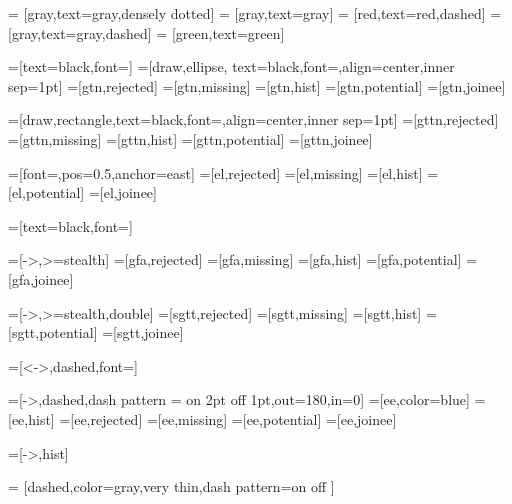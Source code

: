 	\tikzset{every picture/.style = semithick,node distance=1.5cm}
	     = [gray,text=gray,densely dotted]
	 = [gray,text=gray]
	  = [red,text=red,dashed]
	= [gray,text=gray,dashed]
	    = [green,text=green]

  =[text=black,font=\tiny]
    =[draw,ellipse,  text=black,font=\scriptsize,align=center,inner sep=1pt]
   =[gtn,rejected]
   =[gtn,missing]
   =[gtn,hist]
   =[gtn,potential]
   =[gtn,joinee]
  
	 =[draw,rectangle,text=black,font=\scriptsize,align=center,inner sep=1pt]
  =[gttn,rejected]
	=[gttn,missing]
	=[gttn,hist]
	=[gttn,potential]
	=[gttn,joinee]
  
	   =[font=\tiny,pos=0.5,anchor=east] %
     =[el,rejected]
     =[el,missing]
     =[el,hist]
     =[el,potential]
     =[el,joinee]
  
	   =[text=black,font=\small]

	   =[->,>=stealth] %
	  =[gfa,rejected]
	  =[gfa,missing]
	  =[gfa,hist]
	  =[gfa,potential]
	  =[gfa,joinee]
  
	 =[->,>=stealth,double] %
   =[sgtt,rejected]
  =[sgtt,missing]
  =[sgtt,hist]
  =[sgtt,potential]
  =[sgtt,joinee]
  
	   =[<->,dashed,font=\tiny]

     =[->,dashed,dash pattern = on 2pt off 1pt,out=180,in=0]
     =[ee,color=blue]
    =[ee,hist]
     =[ee,rejected]
     =[ee,missing]
     =[ee,potential]
     =[ee,joinee]

	   =[->,hist]

	 = [dashed,color=gray,very thin,dash pattern=on \pgflinewidth off \pgflinewidth]
	\lstset{tabsize=3}
